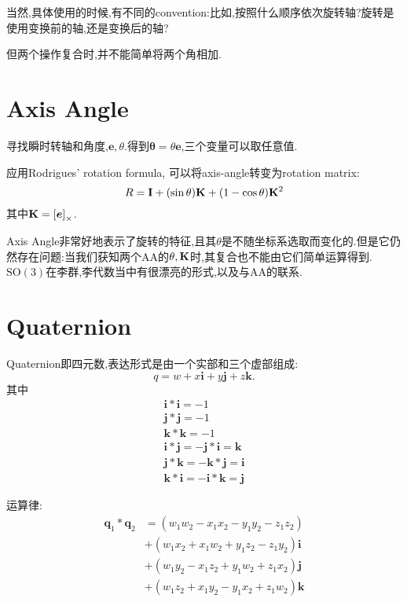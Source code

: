 当然,具体使用的时候,有不同的convention:比如,按照什么顺序依次旋转轴?旋转是使用变换前的轴,还是变换后的轴?

但两个操作复合时,并不能简单将两个角相加.

\section{Axis Angle}
寻找瞬时转轴和角度,$\bm e, \theta$.得到$\bm \theta = \theta \bm e$,三个变量可以取任意值.

应用Rodrigues’ rotation formula, 可以将axis-angle转变为rotation matrix:
\begin{equation}
    R=\bold{I}+(\sin \theta) \bold{K}+(1-\cos \theta) \bold{K}^{2}
\end{equation}
其中$\bold{K} = \left[ \bm e\right]_{\times}$.

Axis Angle非常好地表示了旋转的特征,且其$\theta$是不随坐标系选取而变化的.但是它仍然存在问题:当我们获知两个AA的$\theta, \bold{K}$时,其复合也不能由它们简单运算得到.$\mathrm{SO(3)}$在李群,李代数当中有很漂亮的形式,以及与AA的联系.

\section{Quaternion}
Quaternion即四元数,表达形式是由一个实部和三个虚部组成:
\begin{equation}
    q = w + x \bm i + y \bm j + z \bm k.
\end{equation}
其中
\begin{equation}
    \begin{array}{c}
        \mathbf{i} * \mathbf{i}=-1 \\
        \mathbf{j} * \mathbf{j}=-1 \\
        \mathbf{k} * \mathbf{k}=-1 \\
        \mathbf{i} * \mathbf{j}=-\mathbf{j} * \mathbf{i}=\mathbf{k} \\
        \mathbf{j} * \mathbf{k}=-\mathbf{k} * \mathbf{j}=\mathbf{i} \\
        \mathbf{k} * \mathbf{i}=-\mathbf{i} * \mathbf{k}=\mathbf{j}
    \end{array}
\end{equation}

运算律:
\begin{equation}
    \begin{aligned}
        \mathbf{q}_{1} * \mathbf{q}_{2} &=\left(w_{1} w_{2}-x_{1} x_{2}-y_{1} y_{2}-z_{1} z_{2}\right) \\
        &+\left(w_{1} x_{2}+x_{1} w_{2}+y_{1} z_{2}-z_{1} y_{2}\right) \mathbf{i} \\
        &+\left(w_{1} y_{2}-x_{1} z_{2}+y_{1} w_{2}+z_{1} x_{2}\right) \mathbf{j} \\
        &+\left(w_{1} z_{2}+x_{1} y_{2}-y_{1} x_{2}+z_{1} w_{2}\right) \mathbf{k}
    \end{aligned}
\end{equation}


